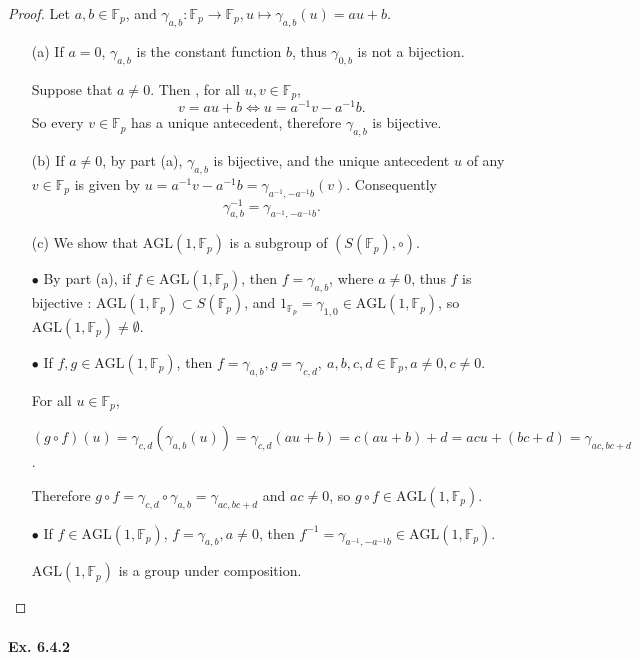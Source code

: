 \documentclass[11pt,a4paper]{article}
\newcommand{\F}{\mathbb{F}}
\begin{document}
\begin{proof}

Let $a,b\in \mathbb{F}_p$, and $\gamma_{a,b} : \F_p\to \F_p, u\mapsto \gamma_{a,b}(u) = au+b$.
\begin{enumerate}
\item[(a)]  If $a=0$, $\gamma_{a,b}$ is the constant function  $b$, thus $\gamma_{0,b}$ is not a bijection.

Suppose that $a\neq 0$. Then , for all $u,v \in \F_p$, 
$$v=au+b \iff u = a^{-1}v - a^{-1} b.$$
So every $v \in \F_p$ has a unique antecedent, therefore $\gamma_{a,b}$ is bijective.

\item[(b)]
If $a\neq 0$, by part (a), $\gamma_{a,b}$ is bijective, and the unique antecedent $u$ of any $v\in \F_p$ is given by $u = a^{-1}v - a^{-1} b = \gamma_{a^{-1}, -a^{-1}b}(v)$.
Consequently
$$\gamma_{a,b}^{-1} =  \gamma_{a^{-1}, -a^{-1}b}.$$

\item[(c)]
We show that $\mathrm{AGL}(1,\F_p)$ is a subgroup of $(S(\F_p),\circ)$.

$\bullet$ By part (a), if $f \in\mathrm{AGL}(1,\F_p)$, then $f = \gamma_{a,b}$, where $a\neq 0$, thus $f$ is bijective :  $\mathrm{AGL}(1,\F_p) \subset S(\F_p)$, and $1_{\F_p} = \gamma_{1,0} \in \mathrm{AGL}(1,\F_p)$, so $\mathrm{AGL}(1,\F_p) \ne \emptyset$.

$\bullet$ If $f,g \in \mathrm{AGL}(1,\F_p)$, then $f = \gamma_{a,b}, g=\gamma_{c,d},\ a,b,c,d \in \F_p, a\neq 0, c\neq 0$.

For all $u \in \F_p$, 

$(g\circ f)(u) = \gamma_{c,d}(\gamma_{a,b}(u)) = \gamma_{c,d}(au+b) = c(au+b)+d = ac u +(bc+d) = \gamma_{ac,bc+d}$.

Therefore $g \circ f =  \gamma_{c,d} \circ \gamma_{a,b} = \gamma_{ac,bc+d}$ and $ac \neq 0$, so $g\circ f \in \mathrm{AGL}(1,\F_p)$.

$\bullet$ If  $f \in \mathrm{AGL}(1,\F_p)$, $f = \gamma_{a,b},a\neq 0$, then $f^{-1} =  \gamma_{a^{-1}, -a^{-1}b} \in \mathrm{AGL}(1,\F_p)$.

$\mathrm{AGL}(1,\F_p)$ is a group under composition.
\end{enumerate}
\end{proof}

\paragraph{Ex. 6.4.2}
\end{document}
